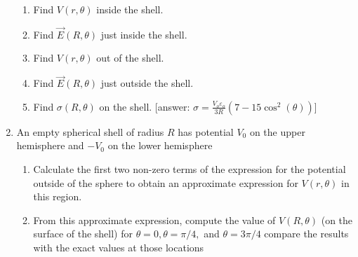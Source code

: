 \begin{enumerate}
\begin{enumerate}
      \item Find $V(r, \theta)$ inside the shell.

      \item Find $\vec{E}(R,\theta)$ just inside the shell.

      \item Find $V(r, \theta)$ out of the shell.

      \item Find $\vec{E}(R, \theta)$ just outside the shell.

      \item Find $\sigma(R, \theta)$ on the shell. [answer: $\sigma = \frac{V_o\varepsilon_o}{3R}(7 - 15\cos^2(\theta))$]

    \end{enumerate}

  \item An empty spherical shell of radius $R$ has potential $V_0$ on the upper hemisphere and $−V_0$ on the lower hemisphere

    \begin{enumerate}

      \item Calculate the first two non-zero terms of the expression for the potential outside of the sphere to obtain an approximate expression for $V(r, \theta)$ in this region.

      \item From this approximate expression, compute the value of $V(R, \theta)$ (on the surface of the shell) for $\theta = 0, \theta = \pi/4,$ and $\theta = 3\pi/4$ compare the results with the exact values at those locations

    \end{enumerate}

\end{enumerate}



